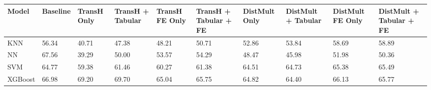 \begin{tabular}{llllllllll}
\toprule
Model & Baseline & TransH Only & TransH + Tabular & TransH FE Only & TransH + Tabular + FE & DistMult Only & DistMult + Tabular & DistMult FE Only & DistMult + Tabular + FE \\
\midrule
KNN & 56.34 & 40.71 & 47.38 & 48.21 & 50.71 & 52.86 & 53.84 & 58.69 & 58.89 \\
NN & 67.56 & 39.29 & 50.00 & 53.57 & 54.29 & 48.47 & 45.98 & 51.98 & 50.36 \\
SVM & 64.77 & 59.38 & 61.46 & 60.27 & 61.38 & 64.51 & 64.73 & 65.38 & 65.49 \\
XGBoost & 66.98 & 69.20 & 69.70 & 65.04 & 65.75 & 64.82 & 64.40 & 66.13 & 65.77 \\
\bottomrule
\end{tabular}
